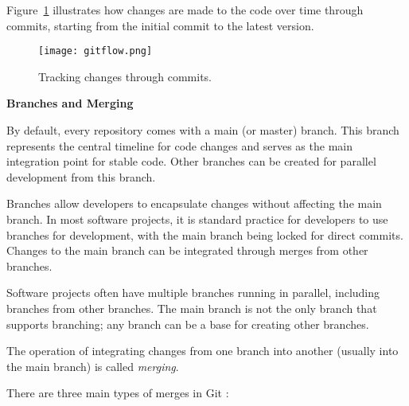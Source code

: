 Figure~\ref{fig:gitflow} illustrates how changes are made to the code over time through commits, starting from the initial commit to the latest version.

\begin{figure}[h!]
\centering
\texttt{[image: gitflow.png]}
\caption{Tracking changes through commits.}
\label{fig:gitflow}
\end{figure}

\textbf{Branches and Merging}

By default, every repository comes with a main (or master) branch. This branch represents the central timeline for code changes and serves as the main integration point for stable code. Other branches can be created for parallel development from this branch.

Branches allow developers to encapsulate changes without affecting the main branch. In most software projects, it is standard practice for developers to use branches for development, with the main branch being locked for direct commits. Changes to the main branch can be integrated through merges from other branches.

Software projects often have multiple branches running in parallel, including branches from other branches. The main branch is not the only branch that supports branching; any branch can be a base for creating other branches.

The operation of integrating changes from one branch into another (usually into the main branch) is called \textit{merging}.

There are three main types of merges in Git \cite{git}:

